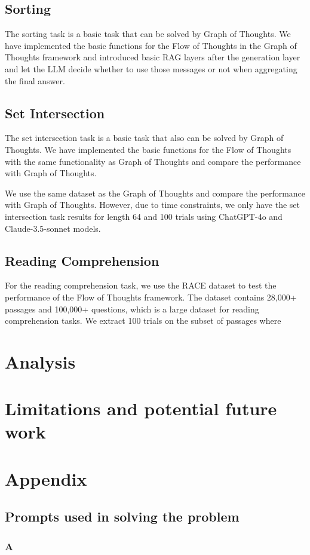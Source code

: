 \documentclass{article}
\begin{document}
\subsection{Sorting}

The sorting task is a basic task that can be solved by Graph of Thoughts. We have implemented the basic functions for the Flow of Thoughts in the Graph of Thoughts framework and introduced basic RAG layers after the generation layer and let the LLM decide whether to use those messages or not when aggregating the final answer.

\subsection{Set Intersection}

The set intersection task is a basic task that also can be solved by Graph of Thoughts. We have implemented the basic functions for the Flow of Thoughts with the same functionality as Graph of Thoughts and compare the performance with Graph of Thoughts.

We use the same dataset as the Graph of Thoughts and compare the performance with Graph of Thoughts. However, due to time constraints, we only have the set intersection task results for length 64 and 100 trials using ChatGPT-4o and Claude-3.5-sonnet models.

\subsection{Reading Comprehension}

For the reading comprehension task, we use the RACE dataset \cite{lai2017large} to test the performance of the Flow of Thoughts framework. The dataset contains 28,000+ passages and 100,000+ questions, which is a large dataset for reading comprehension tasks. We extract 100 trials on the subset of passages where 


\section{Analysis}

\section{Limitations and potential future work}

\medskip
{
\small
{}

}

\section{Appendix}

\subsection{Prompts used in solving the problem}

\subsubsection{A}
\end{document}
